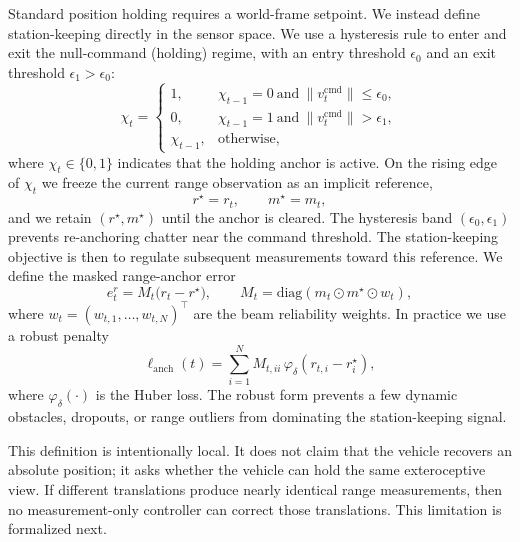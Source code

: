 \documentclass[11pt]{article}
\begin{document}
Standard position holding requires a world-frame setpoint. We instead define
station-keeping directly in the sensor space. We use a hysteresis rule to enter
and exit the null-command (holding) regime, with an entry threshold $\epsilon_0$
and an exit threshold $\epsilon_1>\epsilon_0$:
\begin{equation}
    \chi_t =
    \begin{cases}
        1, & \chi_{t-1}=0 \ \text{and}\ \|v^{\mathrm{cmd}}_t\|\leq \epsilon_0,\\
        0, & \chi_{t-1}=1 \ \text{and}\ \|v^{\mathrm{cmd}}_t\|> \epsilon_1,\\
        \chi_{t-1}, & \text{otherwise},
    \end{cases}
    \label{eq:anchor_hysteresis}
\end{equation}
where $\chi_t\in\{0,1\}$ indicates that the holding anchor is active. On the
rising edge of $\chi_t$ we freeze the current range observation as an implicit
reference,
\begin{equation}
    r^\star = r_{t},\qquad m^\star = m_{t},
    \label{eq:range_anchor}
\end{equation}
and we retain $(r^\star,m^\star)$ until the anchor is cleared. The hysteresis
band $(\epsilon_0,\epsilon_1)$ prevents re-anchoring chatter near the command
threshold. The station-keeping objective is then to regulate subsequent
measurements toward this reference. We define the masked range-anchor error
\begin{equation}
    e^r_t = M_t \bigl(r_t-r^\star\bigr),
    \qquad
    M_t = \mathrm{diag}(m_t \odot m^\star \odot w_t),
    \label{eq:anchor_error}
\end{equation}
where $w_t=(w_{t,1},\ldots,w_{t,N})^\top$ are the beam reliability weights. In
practice we use a robust penalty
\begin{equation}
    \ell_{\mathrm{anch}}(t)
    = \sum_{i=1}^{N} M_{t,ii}\, \varphi_\delta(r_{t,i}-r^\star_i),
    \label{eq:anchor_loss}
\end{equation}
where $\varphi_\delta(\cdot)$ is the Huber loss. The robust form prevents a few
dynamic obstacles, dropouts, or range outliers from dominating the
station-keeping signal.

This definition is intentionally local. It does not claim that the vehicle
recovers an absolute position; it asks whether the vehicle can hold the same
exteroceptive view. If different translations produce nearly identical range
measurements, then no measurement-only controller can correct those
translations. This limitation is formalized next.
\end{document}
